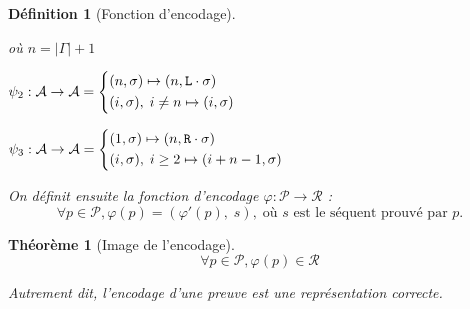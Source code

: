 \documentclass[11pt,a4paper]{article}
\newtheorem{definition}{Définition}
\newtheorem{theorem}{Théorème}
\newcommand*{\Left}{\textnormal{\texttt{L}}}
\newcommand*{\Right}{\textnormal{\texttt{R}}}
\newcommand*{\proofs}{\ensuremath{\mathcal{P}}}
\newcommand*{\addresses}{\ensuremath{\mathcal{A}}}
\newcommand*{\representations}{\ensuremath{\mathcal{R}}}
\newcommand*{\encode}{\ensuremath{\varphi}}
\begin{document}
\begin{definition}[Fonction d'encodage]
\begin{itemize}
{    où $n = | \Gamma | + 1$
    
    $\psi_2 : \addresses \rightarrow \addresses =
    \begin{cases*}
        (n, \sigma) \mapsto (n, \Left \cdot \sigma)\\
        (i, \sigma), \; i \neq n \mapsto (i, \sigma)
    \end{cases*}$
    
    $\psi_3 : \addresses \rightarrow \addresses =
    \begin{cases*}
        (1, \sigma) \mapsto (n, \Right \cdot \sigma)\\
        (i, \sigma), \; i \geq 2 \mapsto (i + n - 1, \sigma)
    \end{cases*}$}
    \end{itemize}

    On définit ensuite la fonction d'encodage $\encode : \proofs \rightarrow \representations$ :
    \begin{equation*}
    \forall p \in \proofs, \encode \left( p \right) = \left( \encode' \left( p \right), \; s \right), \; \text{où $s$ est le séquent prouvé par $p$.}
    \end{equation*}
\end{definition}

\begin{theorem}[Image de l'encodage]
    \begin{equation*}
    \forall p \in \proofs, \encode \left( p \right) \in \representations
    \end{equation*}

    Autrement dit, l'encodage d'une preuve est une représentation correcte.
\end{theorem}
\end{document}
